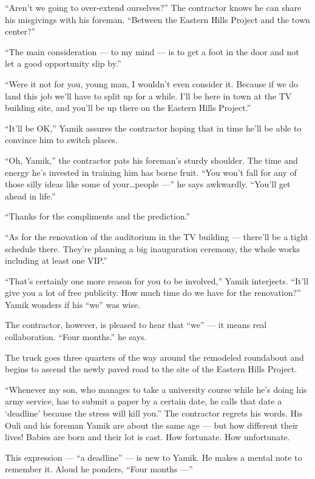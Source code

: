 \documentclass[twoside,11pt,openany]{book}
\begin{document}
``Aren't we going to over-extend ourselves?'' The contractor knows he can share his misgivings
with his foreman. ``Between the Eastern Hills Project and the town center?''

``The main consideration --- to my mind --- is to get a foot in the door and not let a good opportunity slip
by.''

``Were it not for you, young man, I wouldn't even consider it. Because if we do land this job we'll have to
split up for a while. I'll be here in town at the TV building site, and you'll be up there on the Eastern Hills
Project.''

``It'll be OK,'' Yamik assures the contractor hoping that in time he'll be able to convince
him to switch places.

``Oh, Yamik,'' the contractor pats his foreman's sturdy shoulder. The time and energy he's
invested in training him has borne fruit. ``You won't fall for any of those silly ideas like some of
your{\ldots}people ---'' he says awkwardly. ``You'll get ahead in life.''

``Thanks for the compliments and the prediction.''

``As for the renovation of the auditorium in the TV building --- there'll be a tight schedule there. They're
planning a big inauguration ceremony, the whole works including at least one VIP.''

``That's certainly one more reason for you to be involved,'' Yamik interjects.
``It'll give you a lot of free publicity. How much time do we have for the renovation?''
Yamik wonders if his ``we'' was wise.

The contractor, however, is pleased to hear that ``we'' --- it means real collaboration. ``Four
months.'' he says.

The truck goes three quarters of the way around the remodeled roundabout and begins to ascend the newly paved road to
the site of the Eastern Hills Project.

``Whenever my son, who manages{ }to take a university course while he's doing his army
service, has to submit a paper by a certain date, he calls that date a `deadline' because the stress will kill you.''
The contractor regrets his words. His Ouli and his foreman Yamik are about the same age --- but
how different their lives! Babies are born and their lot is cast. How fortunate. How unfortunate.

This expression --- ``a deadline'' --- is new to Yamik. He makes a mental note to remember it.
Aloud he ponders, ``Four months ---''
\end{document}
